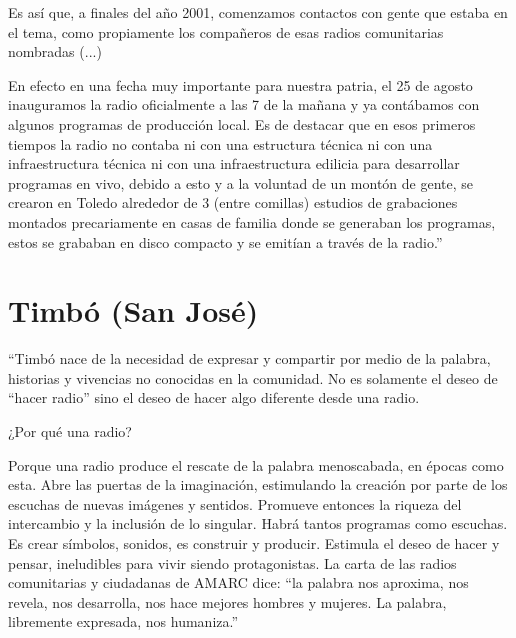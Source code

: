 Es así que, a finales del año 2001, comenzamos contactos con gente que estaba en el tema, como propiamente los compañeros de esas radios comunitarias nombradas (...)
% 

En efecto en una fecha muy importante para nuestra patria, el 25 de agosto inauguramos la radio oficialmente a las 7 de la mañana y ya contábamos con algunos programas de producción local. Es de destacar que en esos primeros tiempos la radio no contaba ni con una estructura técnica ni con una infraestructura técnica ni con una infraestructura edilicia para desarrollar programas en vivo, debido a esto y a la voluntad de un montón de gente, se crearon en Toledo alrededor de 3 (entre comillas) estudios de grabaciones montados precariamente en casas de familia donde se generaban los programas, estos se grababan en disco compacto y se emitían a través de la radio.''

\section*{Timbó (San José)}

``Timbó nace de la necesidad de expresar y compartir por medio de la palabra, historias y vivencias no conocidas en la comunidad. No es solamente el deseo de ``hacer radio'' sino el deseo de hacer algo diferente desde una radio.

¿Por qué una radio?

Porque una radio produce el rescate de la palabra menoscabada, en épocas como esta. Abre las puertas de la imaginación, estimulando la creación por parte de los escuchas de nuevas imágenes y sentidos. Promueve entonces la riqueza del intercambio y la inclusión de lo singular. Habrá tantos programas como escuchas. Es crear símbolos, sonidos, es construir y producir. Estimula el deseo de hacer y pensar, ineludibles para vivir siendo protagonistas. La carta de las radios comunitarias y ciudadanas de AMARC dice: ``la palabra nos aproxima, nos revela, nos desarrolla, nos hace mejores hombres y mujeres. La palabra, libremente expresada, nos humaniza.''

